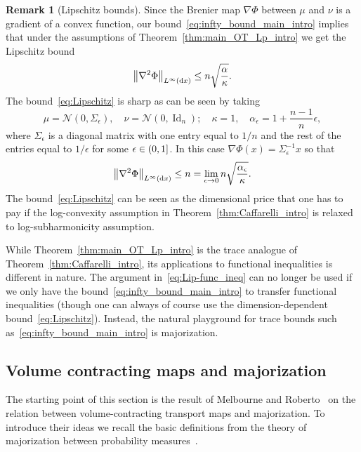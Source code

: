 \documentclass[10pt]{amsart}
\theoremstyle{definition}\newtheorem{defi}[theo]{Definition}\newtheorem{rema}[theo]{Remark}\newtheorem{exam}[theo]{Example}\newtheorem{exem}[theo]{Example}\newtheorem{nota}[theo]{Notation}
\DeclareMathOperator{\Id}{Id}
\newcommand{\dd}{n}
\newcommand{\source}{\mu}
\newcommand{\target}{\nu}
\newcommand{\lsh}{\alpha}
\newcommand{\lc}{\kappa}
\newcommand*\diff{\mathop{}\!\mathrm{d}}
\newcommand{\clN}{\mathcal{N}}
\newcommand{\OT}{\Phi}
\renewcommand*{\to}{\mathchoice{\longrightarrow}{\rightarrow}{\rightarrow}{\rightarrow}}
\let\originalleft\left
\let\originalright\right
\renewcommand{\left}{\mathopen{}\mathclose\bgroup\originalleft}
\renewcommand{\right}{\aftergroup\egroup\originalright}
\let\oldin\in
\renewcommand{\in}{\mathchoice{\oldin}{\oldin}{\,\oldin\,}{\,\oldin\,}}
\begin{document}
\begin{rema}[Lipschitz bounds]\label{rem:Lipschiz}
Since the Brenier map $\nabla\OT$ between $\source$ and $\target$ is a gradient of a convex function, our bound~\eqref{eq:infty_bound_main_intro} implies that under the assumptions of Theorem~\ref{thm:main_OT_Lp_intro} we get the Lipschitz bound
\begin{equation}\label{eq:Lipschitz}
\left\|\nabla^2\OT\right\|_{L^{\infty}(\diff x)}\le\dd \sqrt{ \frac{\lsh}{\lc}}.
\end{equation}
The bound~\eqref{eq:Lipschitz} is sharp as can be seen by taking
\[
\source=\clN(0,\Sigma_{\epsilon}),\quad \target=\clN(0,\Id_{\dd}); \quad \lc=1, \quad \lsh_{\epsilon}=1+\frac{\dd-1}{\dd}\epsilon,
\]
where $\Sigma_{\epsilon}$ is a diagonal matrix with one entry equal to $1/\dd$ and the rest of the entries equal to $1/\epsilon$ for some $\epsilon\in (0,1]$. In this case $\nabla\OT(x)=\Sigma_{\epsilon}^{-1}x$ so that
\[
\left\|\nabla^2\OT\right\|_{L^{\infty}(\diff x)}\le \dd=\lim_{\epsilon\to 0}\dd \sqrt{ \frac{\lsh_{\epsilon}}{\lc}}.
\]
The bound~\eqref{eq:Lipschitz} can be seen as the dimensional price that one has to pay if the log-convexity assumption in Theorem~\ref{thm:Caffarelli_intro} is relaxed to log-subharmonicity assumption.
\end{rema}

While Theorem~\ref{thm:main_OT_Lp_intro} is the trace analogue of Theorem~\ref{thm:Caffarelli_intro}, its applications to functional inequalities is different in nature. The argument in~\eqref{eq:Lip-func_ineq} can no longer be used if we only have the bound~\eqref{eq:infty_bound_main_intro} to transfer functional inequalities (though one can always of course use the dimension-dependent bound~\eqref{eq:Lipschitz}). Instead, the natural playground for trace bounds such as~\eqref{eq:infty_bound_main_intro} is majorization.



\subsection{Volume contracting maps and majorization}\label{subsec:vol_contract_majorization}
The starting point of this section is the result of Melbourne and Roberto~\cite{MR2023} on the relation between volume-contracting transport maps and majorization. To introduce their ideas we recall the basic definitions from the theory of majorization between probability measures~\cite{marshall2011inequalities}.
\end{document}
